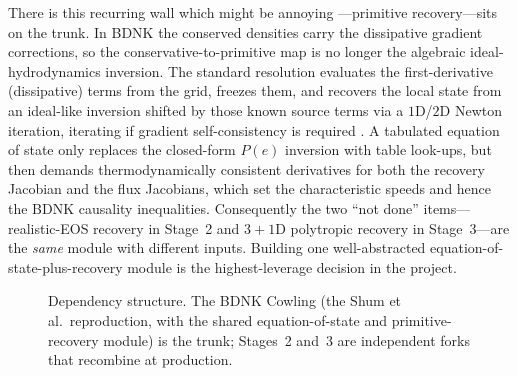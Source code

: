 \documentclass[11pt]{article}
\begin{document}
There is this recurring wall which might be annoying ---primitive recovery---sits on the trunk. In BDNK the
conserved densities carry the dissipative gradient corrections, so the
conservative-to-primitive map is no longer the algebraic ideal-hydrodynamics
inversion. The standard resolution evaluates the first-derivative (dissipative)
terms from the grid, freezes them, and recovers the local state from an ideal-like
inversion shifted by those known source terms via a $1$D/$2$D Newton iteration,
iterating if gradient self-consistency is required \cite{PandyaMostPretorius2022}.
A tabulated equation of state only replaces the closed-form $P(e)$ inversion with
table look-ups, but then demands thermodynamically consistent derivatives for both
the recovery Jacobian and the flux Jacobians, which set the characteristic speeds
and hence the BDNK causality inequalities. Consequently the two ``not done''
items---realistic-EOS recovery in Stage~2 and $3{+}1$D polytropic recovery in
Stage~3---are the \emph{same} module with different inputs. Building one
well-abstracted equation-of-state-plus-recovery module is the highest-leverage
decision in the project.

\begin{figure}[h]
\centering
{}
\caption{Dependency structure. The BDNK Cowling (the Shum et al.\
reproduction, with the shared equation-of-state and primitive-recovery module) is
the trunk; Stages~2 and~3 are independent forks that recombine at production.}
\label{fig:dep}
\end{figure}
\end{document}
